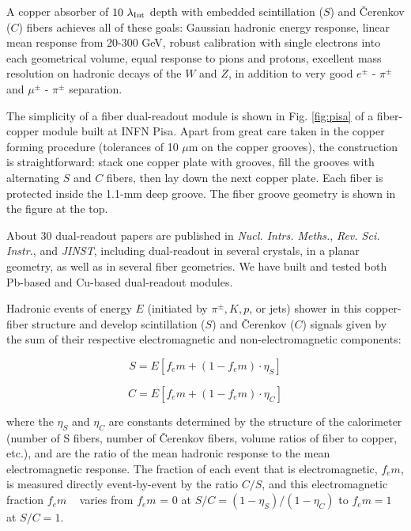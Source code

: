  
 A copper absorber of $10 ~\lambda_{\rm Int}$ depth with embedded scintillation ($S$) and \v{C}er\-enk\-ov ($C$) fibers achieves
 all of these goals:  Gaussian hadronic energy response,  linear mean response from 20-300 GeV, 
  robust calibration with single electrons into each geometrical volume, 
  equal response to pions and protons, 
  excellent mass resolution on hadronic decays of the $W$ and $Z$,
  in addition to very good $e^{\pm}$ -  $\pi^{\pm}$  and  $\mu^{\pm}$ -  $\pi^{\pm}$ separation.  
 
 
 
 The simplicity of a fiber dual-readout module is shown in Fig. \ref{fig:pisa} of a fiber-copper module built at INFN Pisa.  
 Apart from great care taken in the copper forming procedure (tolerances of 10 $\mu$m on the copper grooves), the 
 construction is straightforward:  stack one copper plate with grooves, fill the grooves with alternating $S$ and $C$ fibers,
 then lay down the next copper plate.  Each fiber is protected inside the 1.1-mm deep groove.   The fiber groove geometry
 is shown in the figure at the top.   
 
About 30 dual-readout papers are published in {\it Nucl. Intrs. Meths.}, {\it Rev. Sci. Instr.}, and {\it JINST}, including
dual-readout in several crystals, in a planar geometry, as well as in several fiber geometries. We have built
and tested both Pb-based and Cu-based dual-readout modules.   



Hadronic events of energy $E$ (initiated by $\pi^{\pm}, K, p$, or jets) shower in this copper-fiber structure and develop scintillation ($S$) and 
\v{C}er\-enk\-ov ($C$) signals given by the sum of their respective electromagnetic and non-electromagnetic components:

\begin{displaymath}
  S = E [ f_em + (1 - f_em) \cdot \eta_S ]
\end{displaymath}

\begin{displaymath}
  C = E [ f_em + (1 - f_em) \cdot \eta_C ]
\end{displaymath}

\noindent where the $\eta_S$ and $\eta_C$ are constants determined by the structure of the calorimeter (number of S fibers, number of \v{C}er\-enk\-ov fibers, volume ratios of fiber to copper, etc.), and are the ratio of the mean hadronic response to the mean electromagnetic response.  The fraction of each event that is electromagnetic, $f_em$, is measured directly event-by-event by the ratio $C/S$, and this electromagnetic fraction $f_em$ ~ varies from $f_em$ = 0 at $S/C = (1-\eta_S)/(1-\eta_C)$ to $f_em=1$ at $S/C=1$.

